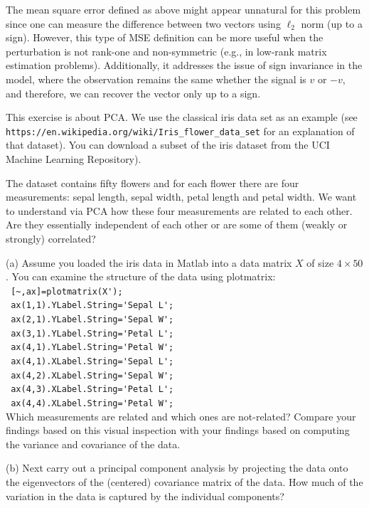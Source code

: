 \begin{remark}
    The mean square error defined as above might appear unnatural for this problem since one can measure the difference between two vectors using $\ell_2$ norm (up to a sign). However, this type of MSE definition can be more useful when the perturbation is not rank-one and non-symmetric (e.g., in low-rank matrix estimation problems). Additionally, it addresses the issue of sign invariance in the model, where the observation remains the same whether the signal is $v$ or $-v$, and therefore,  we can recover the vector only up to a sign.
\end{remark}



\begin{myexercise}
This exercise is about PCA. We use the classical iris data set as an example (see \verb|https://en.wikipedia.org/wiki/Iris_flower_data_set|
for an explanation of that dataset). You can download a subset of the iris dataset from the UCI Machine Learning Repository).

The dataset contains fifty flowers and for each flower there are four measurements: sepal length, sepal width, petal length and petal width.
We want to understand via PCA
how these four measurements are related to each other. Are they essentially independent of each other or are some of them (weakly or strongly) correlated?

\noindent
(a) Assume you loaded the iris data in Matlab into a data matrix $X$ of size $4 \times 50$. You can examine the structure of the data using plotmatrix: \\
\verb| [~,ax]=plotmatrix(X');|  \\
\verb| ax(1,1).YLabel.String='Sepal L';| \\
\verb| ax(2,1).YLabel.String='Sepal W';| \\
\verb| ax(3,1).YLabel.String='Petal L';|\\
\verb| ax(4,1).YLabel.String='Petal W';|\\
\verb| ax(4,1).XLabel.String='Sepal L';|\\
\verb| ax(4,2).XLabel.String='Sepal W';|\\
\verb| ax(4,3).XLabel.String='Petal L';|\\
\verb| ax(4,4).XLabel.String='Petal W';|\\

Which measurements are related and which ones are not-related? Compare your findings based on this visual inspection with your findings based on computing the variance and covariance of the data.

\noindent
(b) Next carry out a principal component analysis by projecting the data onto the eigenvectors of the (centered) covariance matrix of the data.
How much of the variation in the data is captured by the individual components? 
\end{myexercise}


